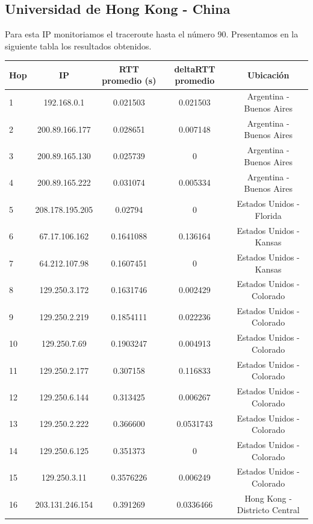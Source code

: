 \subsection{Universidad de Hong Kong - China}

Para esta IP monitoriamos el traceroute hasta el número 90. Presentamos en la siguiente tabla los resultados obtenidos.

\bigskip

\begin{tabular}{ | l | c | c | c | c |}
	\hline
		Hop & IP &  RTT promedio (s)  & deltaRTT promedio & Ubicación\\
 	\hline
		1  &  192.168.0.1  &  0.021503 &  0.021503 & Argentina - Buenos Aires \\
	\hline
		2  &  200.89.166.177  &  0.028651 &  0.007148 & Argentina - Buenos Aires\\
	\hline
		3  &  200.89.165.130  &  0.025739 &  0 & Argentina - Buenos Aires\\
	\hline
		4  &  200.89.165.222  &  0.031074 &  0.005334 & Argentina - Buenos Aires\\
	\hline
		5  &  208.178.195.205  &  0.02794 &  0 & Estados Unidos - Florida \\
	\hline
		6  &  67.17.106.162  &  0.1641088 &  0.136164 & Estados Unidos - Kansas \\
	\hline
		7  &  64.212.107.98  &  0.1607451 &  0 & Estados Unidos - Kansas \\
	\hline
		8  &  129.250.3.172  &  0.1631746 &  0.002429 & Estados Unidos - Colorado \\
	\hline
		9  &  129.250.2.219  &  0.1854111 &  0.022236 & Estados Unidos - Colorado\\
	\hline
		10  &  129.250.7.69  &  0.1903247 &  0.004913 & Estados Unidos - Colorado \\
	\hline
		11  &  129.250.2.177  &  0.307158 &  0.116833 & Estados Unidos - Colorado \\
	\hline
		12  &  129.250.6.144  &  0.313425 &  0.006267 & Estados Unidos - Colorado\\
	\hline
		13  &  129.250.2.222  &  0.366600 &  0.0531743 & Estados Unidos - Colorado\\
	\hline
		14  &  129.250.6.125  &  0.351373 &  0 & Estados Unidos - Colorado \\
	\hline
		15  &  129.250.3.11  &  0.3576226 &  0.006249 & Estados Unidos - Colorado\\
	\hline
		16  &  203.131.246.154 &  0.391269 &  0.0336466 & Hong Kong - Districto Central \\

\end{tabular}
